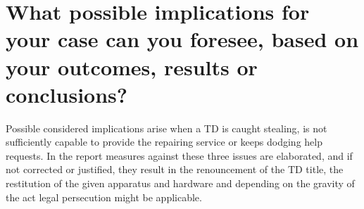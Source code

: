 \section{What possible implications for your case can you foresee, based on your outcomes, results or conclusions?}

Possible considered implications arise when a TD is caught stealing, is not sufficiently capable to provide the repairing service or keeps dodging help requests. In the report measures against these three issues are elaborated, and if not corrected or justified, they result in the renouncement of the TD title, the restitution of the given apparatus and hardware and depending on the gravity of the act legal persecution might be applicable.